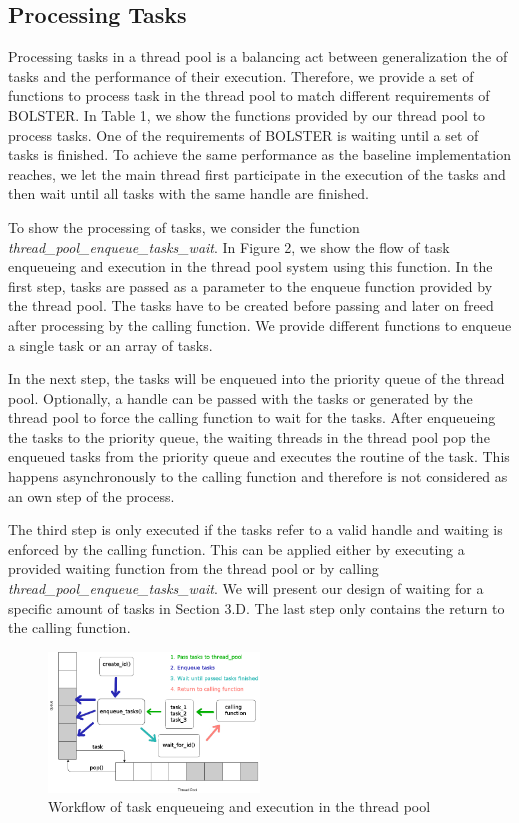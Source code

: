 \documentclass[conference]{IEEEtran}
\begin{document}
\subsection{Processing Tasks}
Processing tasks in a thread pool is a balancing act between generalization the of tasks and the performance of their execution. Therefore, we provide a set of functions to process task in the thread pool to match different requirements of BOLSTER. In Table 1, we show the functions provided by our thread pool to process tasks. One of the requirements of BOLSTER is waiting until a set of tasks is finished. To achieve the same performance as the baseline implementation reaches, we let the main thread first participate in the execution of the tasks and then wait until all tasks with the same handle are finished. 

To show the processing of tasks, we consider the function \emph{thread\_pool\_enqueue\_tasks\_wait}. In Figure 2, we show the flow of task enqueueing and execution in the thread pool system using this function. In the first step, tasks are passed as a parameter to the enqueue function provided by the thread pool. The tasks have to be created before passing and later on freed after processing by the calling function.  We provide different functions to enqueue a single task or an array of tasks. 

In the next step, the tasks will be enqueued into the priority queue of the thread pool. Optionally, a handle can be passed with the tasks or generated by the thread pool to force the calling function to wait for the tasks. After enqueueing the tasks to the priority queue, the waiting threads in the thread pool pop the enqueued tasks from the priority queue and executes the routine of the task. This happens asynchronously to the calling function and therefore is not considered as an own step of the process.

The third step is only executed if the tasks refer to a valid handle and waiting is enforced by the calling function. This can be applied either by executing a provided waiting function from the thread pool or by calling \emph{thread\_pool\_enqueue\_tasks\_wait}. We will present our design of waiting for a specific amount of tasks in Section 3.D. The last step only contains the return to the calling function.

\begin{figure}
	\includegraphics[width=0.5\textwidth]{img/pool_queue.png}
	\caption{Workflow of task enqueueing and execution in the thread pool}
	\label{fig1}
\end{figure}
\end{document}
